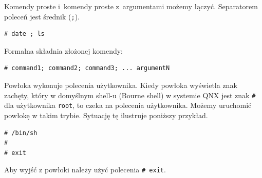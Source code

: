 \begin{example}\label{ex:prostakomenda3}

Komendy proste i~komendy proste z~argumentami możemy łączyć. Separatorem poleceń jest średnik (\lstinline[style=MyBashStyle]{;}).


\begin{lstlisting}[style=MyBashStyle]
# date ; ls
\end{lstlisting}

Formalna składnia złożonej komendy:

\begin{lstlisting}[style=MyBashStyle]
# command1; command2; command3; ... argumentN
\end{lstlisting}
\end{example}

%
%
%
%
%
%
%
%
%

\begin{example}\label{ex:prostakomenda6}


Powłoka wykonuje polecenia użytkownika. Kiedy powłoka wyświetla znak zachęty, który w domyślnym shell-u (Bourne shell) w systemie QNX jest znak \lstinline[style=MyBashStyle]{#} dla użytkownika \lstinline[style=MyBashStyle]{root}, to czeka na polecenia użytkownika. Możemy uruchomić powłokę w takim trybie. Sytuację tę ilustruje poniższy przykład.


\begin{lstlisting}[style=MyBashStyle]
# /bin/sh
#
# exit
\end{lstlisting}

Aby wyjść z powłoki należy użyć polecenia \lstinline[style=MyBashStyle]{# exit}.
\end{example}

